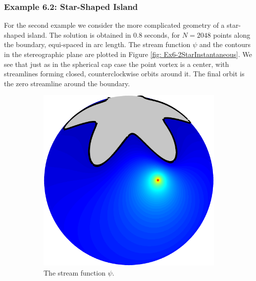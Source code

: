 \documentclass{sfuthesis}
\begin{document}
\subsubsection{Example 6.2: Star-Shaped Island} 
For the second example we consider the more complicated geometry of a star-shaped island. The solution is obtained in 0.8 seconds, for $N=2048$ points along the boundary, equi-spaced in arc length. The stream function $\psi$ and the contours in the stereographic plane are plotted in Figure \ref{fig: Ex6-2StarInstantaneous}. We see that just as in the spherical cap case the point vortex is a center, with streamlines forming closed, counterclockwise orbits around it. The final orbit is the zero streamline around the boundary. 

 \begin{figure}[h]
        \centering
        \begin{subfigure}[b]{0.35\textwidth}
        		\includegraphics[width=\textwidth]{Ex6-2StarStreamFn}
			\caption{The stream function $\psi$.  \vspace{0.3cm} }
     \end{subfigure} \hspace{1cm}
      \begin{subfigure}[b]{0.4\textwidth}

\end{subfigure}
\end{figure}
\end{document}
